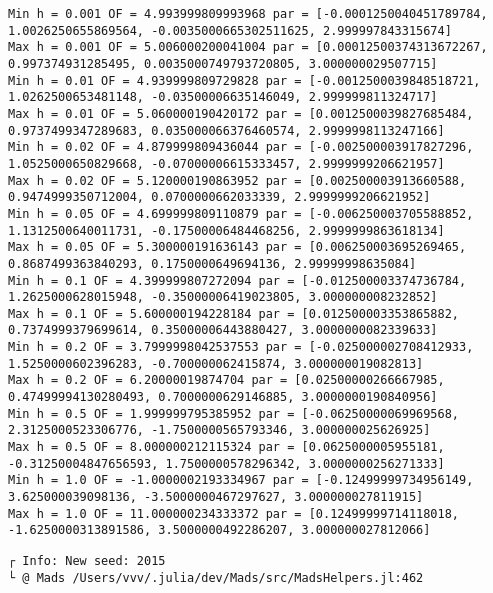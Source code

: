 \documentclass[11pt]{article}
\begin{document}
    \begin{Verbatim}[commandchars=\\\{\}]
Min h = 0.001 OF = 4.993999809993968 par = [-0.0001250040451789784,
1.0026250655869564, -0.0035000665302511625, 2.999997843315674]
Max h = 0.001 OF = 5.006000200041004 par = [0.00012500374313672267,
0.997374931285495, 0.0035000749793720805, 3.000000029507715]
Min h = 0.01 OF = 4.939999809729828 par = [-0.0012500039848518721,
1.0262500653481148, -0.03500006635146049, 2.999999811324717]
Max h = 0.01 OF = 5.060000190420172 par = [0.0012500039827685484,
0.9737499347289683, 0.035000066376460574, 2.9999998113247166]
Min h = 0.02 OF = 4.879999809436044 par = [-0.002500003917827296,
1.0525000650829668, -0.07000006615333457, 2.9999999206621957]
Max h = 0.02 OF = 5.120000190863952 par = [0.002500003913660588,
0.9474999350712004, 0.0700000662033339, 2.9999999206621952]
Min h = 0.05 OF = 4.699999809110879 par = [-0.006250003705588852,
1.1312500640011731, -0.17500006484468256, 2.9999999863618134]
Max h = 0.05 OF = 5.300000191636143 par = [0.006250003695269465,
0.8687499363840293, 0.1750000649694136, 2.99999998635084]
Min h = 0.1 OF = 4.399999807272094 par = [-0.012500003374736784,
1.2625000628015948, -0.35000006419023805, 3.000000008232852]
Max h = 0.1 OF = 5.600000194228184 par = [0.012500003353865882,
0.7374999379699614, 0.35000006443880427, 3.0000000082339633]
Min h = 0.2 OF = 3.7999998042537553 par = [-0.025000002708412933,
1.5250000602396283, -0.700000062415874, 3.000000019082813]
Max h = 0.2 OF = 6.20000019874704 par = [0.02500000266667985,
0.47499994130280493, 0.7000000629146885, 3.0000000190840956]
Min h = 0.5 OF = 1.999999795385952 par = [-0.06250000069969568,
2.3125000523306776, -1.7500000565793346, 3.000000025626925]
Max h = 0.5 OF = 8.000000212115324 par = [0.0625000005955181,
-0.31250004847656593, 1.7500000578296342, 3.0000000256271333]
Min h = 1.0 OF = -1.0000002193334967 par = [-0.12499999734956149,
3.625000039098136, -3.5000000467297627, 3.000000027811915]
Max h = 1.0 OF = 11.000000234333372 par = [0.12499999714118018,
-1.6250000313891586, 3.5000000492286207, 3.000000027812066]
    \end{Verbatim}

    \begin{Verbatim}[commandchars=\\\{\}]
┌ Info: New seed: 2015
└ @ Mads /Users/vvv/.julia/dev/Mads/src/MadsHelpers.jl:462
    \end{Verbatim}
\end{document}
